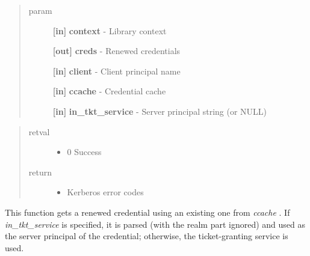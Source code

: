 \documentclass[letterpaper,10pt,english]{sphinxmanual}
\begin{document}
\begin{fulllineitems}
\label{appdev/refs/api/krb5_get_renewed_creds:krb5_get_renewed_creds}
\end{fulllineitems}

\begin{quote}\begin{description}
\item[{param}] \leavevmode
\textbf{{[}in{]}} \textbf{context} - Library context

\textbf{{[}out{]}} \textbf{creds} - Renewed credentials

\textbf{{[}in{]}} \textbf{client} - Client principal name

\textbf{{[}in{]}} \textbf{ccache} - Credential cache

\textbf{{[}in{]}} \textbf{in\_tkt\_service} - Server principal string (or NULL)

\end{description}\end{quote}
\begin{quote}\begin{description}
\item[{retval}] \leavevmode\begin{itemize}
\item {} 
0   Success

\end{itemize}

\item[{return}] \leavevmode\begin{itemize}
\item {} 
Kerberos error codes

\end{itemize}

\end{description}\end{quote}

This function gets a renewed credential using an existing one from \emph{ccache} . If \emph{in\_tkt\_service} is specified, it is parsed (with the realm part ignored) and used as the server principal of the credential; otherwise, the ticket-granting service is used.
\end{document}
